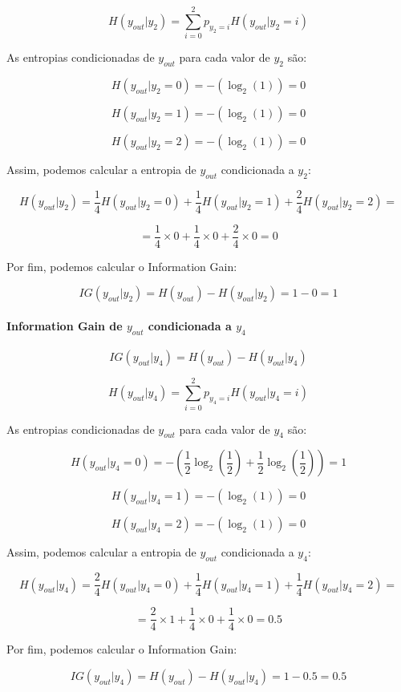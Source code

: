 \documentclass{article}
\begin{document}
\[ H(y_{out}|y_2) = \sum_{i=0}^{2} p_{y_2 = i} H(y_{out}|y_2 = i) \]

As entropias condicionadas de $y_{out}$ para cada valor de $y_2$ são:

\[ H(y_{out}|y_2 = 0) = - \left( \log_2(1) \right) = 0 \]

\[ H(y_{out}|y_2 = 1) = - \left( \log_2(1) \right) = 0 \]

\[ H(y_{out}|y_2 = 2) = - \left( \log_2(1) \right) = 0 \]

Assim, podemos calcular a entropia de $y_{out}$ condicionada a $y_2$:

\[ H(y_{out}|y_2) = \frac{1}{4} H(y_{out}|y_2 = 0) + \frac{1}{4} H(y_{out}|y_2 = 1) + \frac{2}{4} H(y_{out}|y_2 = 2) = \]

\[ = \frac{1}{4} \times 0 + \frac{1}{4} \times 0 + \frac{2}{4} \times 0 = 0 \]

Por fim, podemos calcular o Information Gain:

\[ IG(y_{out}|y_2) = H(y_{out}) - H(y_{out}|y_2) = 1 - 0 = 1 \]

\paragraph{Information Gain de $y_{out}$ condicionada a $y_4$}

\[ IG(y_{out}|y_4) = H(y_{out}) - H(y_{out}|y_4) \]

\[ H(y_{out}|y_4) = \sum_{i=0}^{2} p_{y_4 = i} H(y_{out}|y_4 = i) \]

As entropias condicionadas de $y_{out}$ para cada valor de $y_4$ são:

\[ H(y_{out}|y_4 = 0) = - \left( \frac{1}{2} \log_2 \left( \frac{1}{2} \right) + \frac{1}{2} \log_2 \left( \frac{1}{2} \right) \right) = 1 \]

\[ H(y_{out}|y_4 = 1) = - \left( \log_2(1) \right) = 0 \]

\[ H(y_{out}|y_4 = 2) = - \left( \log_2(1) \right) = 0 \]

Assim, podemos calcular a entropia de $y_{out}$ condicionada a $y_4$:

\[ H(y_{out}|y_4) = \frac{2}{4} H(y_{out}|y_4 = 0) + \frac{1}{4} H(y_{out}|y_4 = 1) + \frac{1}{4} H(y_{out}|y_4 = 2) = \]

\[ = \frac{2}{4} \times 1 + \frac{1}{4} \times 0 + \frac{1}{4} \times 0 = 0.5 \]

Por fim, podemos calcular o Information Gain:

\[ IG(y_{out}|y_4) = H(y_{out}) - H(y_{out}|y_4) = 1 - 0.5 = 0.5 \]
\end{document}
